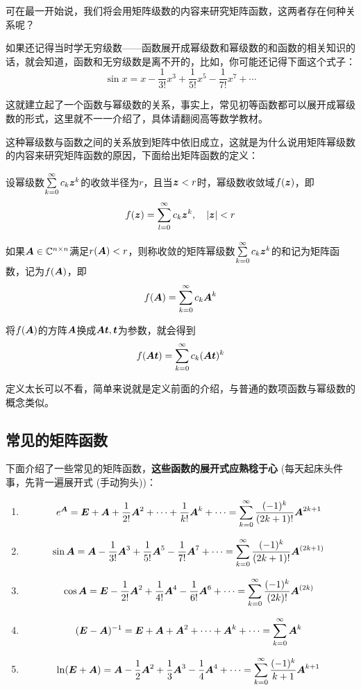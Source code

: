 \documentclass[12pt, a4paper, oneside, UTF8]{ctexbook}
\begin{document}
可在最一开始说，我们将会用矩阵级数的内容来研究矩阵函数，这两者存在何种关系呢？

如果还记得当时学无穷级数——函数展开成幂级数和幂级数的和函数的相关知识的话，就会知道，函数和无穷级数是离不开的，比如，你可能还记得下面这个式子：\[\sin x=x-\frac{1}{3!}x^3+\frac{1}{5!}x^5-\frac{1}{7!}x^7+\cdots\]

这就建立起了一个函数与幂级数的关系，事实上，常见初等函数都可以展开成幂级数的形式，这里就不一一介绍了，具体请翻阅高等数学教材。

这种幂级数与函数之间的关系放到矩阵中依旧成立，这就是为什么说用矩阵幂级数的内容来研究矩阵函数的原因，下面给出矩阵函数的定义：
\begin{defn}{}{}
    设幂级数$\sum\limits_{k=0}^{\infty}c_k\boldsymbol{z}^k$的收敛半径为$r$，且当$\boldsymbol{z}<r$时，幂级数收敛域$f(\boldsymbol{z})$，即\[f(\bs{z})=\sum_{l=0}^{\infty}c_k\bs{z}^k,\ \ \ |\bs{z}|<r\]

    如果$\boldsymbol{A}\in\mathbb{C}^{n\times n}$满足$r(\boldsymbol{A})<r$，则称收敛的矩阵幂级数$\sum\limits_{k=0}^{\infty}c_k\boldsymbol{z}^k$的和记为矩阵函数，记为$f(\boldsymbol{A})$，即\[f(\boldsymbol{A})=\sum_{k=0}^{\infty}c_k\boldsymbol{A}^k\]

    将$f(\boldsymbol{A})$的方阵$\boldsymbol{A}$换成$\boldsymbol{A}\boldsymbol{t}, \boldsymbol{t}$为参数，就会得到\[f(\boldsymbol{A}\boldsymbol{t})=\sum_{k=0}^{\infty}c_k(\boldsymbol{A}\boldsymbol{t})^k\]
\end{defn}

定义太长可以不看，简单来说就是定义前面的介绍，与普通的数项函数与幂级数的概念类似。
\subsection{常见的矩阵函数}
下面介绍了一些常见的矩阵函数，\textbf{这些函数的展开式应熟稔于心} (每天起床头件事，先背一遍展开式 (手动狗头))：
\begin{enumerate}
    \item \[e^{\boldsymbol{A}}=\boldsymbol{E}+\boldsymbol{A}+\frac{1}{2!}\boldsymbol{A}^2+\cdots+\frac{1}{k!}\boldsymbol{A}^k+\cdots=\sum_{k=0}^{\infty}\frac{(-1)^k}{(2k+1)!}\boldsymbol{A}^{2k+1}\]
    \item \[\sin\boldsymbol{A}=\boldsymbol{A}-\frac{1}{3!}\boldsymbol{A}^3+\frac{1}{5!}\boldsymbol{A}^5-\frac{1}{7!}\boldsymbol{A}^7+\cdots=\sum_{k=0}^{\infty}\frac{(-1)^k}{(2k+1)!}\boldsymbol{A}^{(2k+1)}\]
    \item \[\cos\boldsymbol{A}=\boldsymbol{E}-\frac{1}{2!}\boldsymbol{A}^2+\frac{1}{4!}\boldsymbol{A}^4-\frac{1}{6!}\boldsymbol{A}^6+\cdots=\sum_{k=0}^{\infty}\frac{(-1)^k}{(2k)!}\boldsymbol{A}^{(2k)}\]
    \item \[(\boldsymbol{E}-\boldsymbol{A})^{-1}=\boldsymbol{E}+\boldsymbol{A}+\boldsymbol{A}^2+\cdots+\boldsymbol{A}^k+\cdots=\sum_{k=0}^{\infty}\boldsymbol{A}^k\]
    \item \[\ln(\boldsymbol{E}+\boldsymbol{A})=\boldsymbol{A}-\frac{1}{2}\boldsymbol{A}^2+\frac{1}{3}\boldsymbol{A}^3-\frac{1}{4}\boldsymbol{A}^4+\cdots=\sum_{k=0}^{\infty}\frac{(-1)^k}{k+1}\boldsymbol{A}^{k+1}\]
\end{enumerate}
\end{document}
